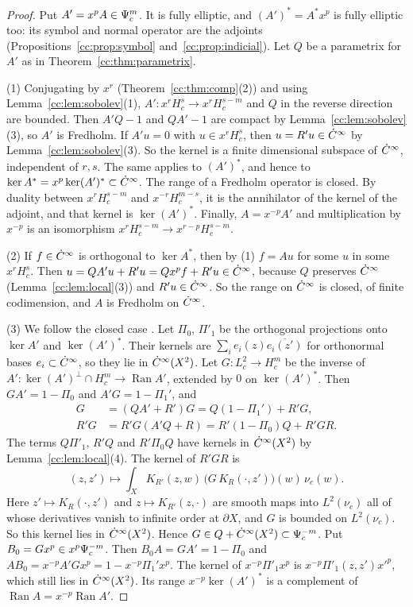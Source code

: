 \begin{proof}
Put \(A'=x^pA\in\Psi_{c}^m\). It is fully elliptic, and \((A')^*=A^*x^p\) is
fully elliptic too: its symbol and normal operator are the adjoints
(Propositions~\ref{cc:prop:symbol} and~\ref{cc:prop:indicial}). Let \(Q\)
be a parametrix for \(A'\) as in Theorem~\ref{cc:thm:parametrix}.

(1) Conjugating by \(x^r\) (Theorem~\ref{cc:thm:comp}(2)) and using
Lemma~\ref{cc:lem:sobolev}(1), \(A':x^rH^s_c\to x^rH^{s-m}_c\) and \(Q\) in
the reverse direction are bounded. Then \(A'Q-1\) and \(QA'-1\) are compact
by Lemma~\ref{cc:lem:sobolev}(3), so \(A'\) is Fredholm. If \(A'u=0\) with
\(u\in x^rH^s_c\), then \(u=R'u\in\dot C^\infty\) by
Lemma~\ref{cc:lem:sobolev}(3). So the kernel is a finite dimensional
subspace of \(\dot C^\infty\), independent of \(r,s\). The same applies to
\((A')^*\), and hence to \(\ker A^*=x^p\ker(A')^*\subset\dot C^\infty\). The range
of a Fredholm operator is closed. By duality between \(x^rH^{s-m}_c\) and
\(x^{-r}H^{m-s}_c\), it is the annihilator of the kernel of the adjoint,
and that kernel is \(\ker(A')^*\). Finally, \(A=x^{-p}A'\) and
multiplication by \(x^{-p}\) is an isomorphism \(x^rH^{s-m}_c\to
x^{r-p}H^{s-m}_c\).

(2) If \(f\in\dot C^\infty\) is orthogonal to \(\ker A^*\), then by (1) \(f=Au\)
for some \(u\) in some \(x^rH^s_c\). Then \(u=QA'u+R'u=Qx^pf+R'u\in\dot C^\infty\),
because \(Q\) preserves \(\dot C^\infty\) (Lemma~\ref{cc:lem:local}(3)) and \(R'u\in
\dot C^\infty\). So the range on \(\dot C^\infty\) is closed, of finite codimension, and
\(A\) is Fredholm on \(\dot C^\infty\).

(3) We follow the closed case \cite[Ch.~4]{MelroseMicro}. Let
\(\Pi_0\), \(\Pi'_1\) be the orthogonal projections onto \(\ker A'\) and
\(\ker(A')^*\). Their kernels are \(\sum_ie_i(z)\overline{e_i(z')}\) for
orthonormal bases \(e_i\subset\dot C^\infty\), so they lie in \(\dot C^\infty(X^2)\). Let
\(G:L^2_c\to H^m_c\) be the inverse of \(A':\ker(A')^\perp\cap H^m_c\to
\operatorname{Ran}A'\), extended by \(0\) on \(\ker(A')^*\). Then
\(GA'=1-\Pi_0\) and \(A'G=1-\Pi_1'\), and
\begin{align*}
 G&=(QA'+R')G=Q(1-\Pi_1')+R'G,\\
 R'G&=R'G(A'Q+R)=R'(1-\Pi_0)Q+R'GR .
\end{align*}
The terms \(Q\Pi'_1\), \(R'Q\) and \(R'\Pi_0Q\) have kernels in \(\dot C^\infty(X^2)\)
by Lemma~\ref{cc:lem:local}(4). The kernel of \(R'GR\) is
\[
 (z,z')\longmapsto\int_XK_{R'}(z,w)\,\bigl(G\,K_R(\cdot,z')\bigr)(w)\,
 \nu_c(w).
\]
Here \(z'\mapsto K_R(\cdot,z')\) and \(z\mapsto K_{R'}(z,\cdot)\) are smooth
maps into \(L^2(\nu_c)\) all of whose derivatives vanish to infinite order
at \(\partial X\), and \(G\) is bounded on \(L^2(\nu_c)\). So this kernel
lies in \(\dot C^\infty(X^2)\). Hence
\(G\in Q+\dot C^\infty(X^2)\subset\Psi_{c}^{-m}\). Put \(B_0=Gx^p\in x^p\Psi_{c}^{-m}\).
Then \(B_0A=GA'=1-\Pi_0\) and \(AB_0=x^{-p}A'Gx^p=1-x^{-p}\Pi_1'x^p\). The
kernel of \(x^{-p}\Pi'_1x^p\) is \(x^{-p}\Pi'_1(z,z')x'^p\), which still
lies in \(\dot C^\infty(X^2)\). Its range \(x^{-p}\ker(A')^*\) is a complement of
\(\operatorname{Ran}A=x^{-p}\operatorname{Ran}A'\).
\end{proof}

